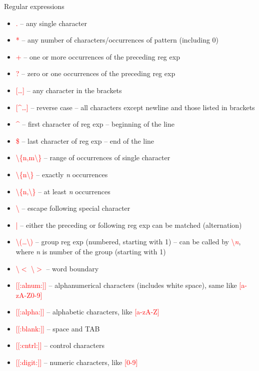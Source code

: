 \documentclass[compress, ucs, xelatex, 11pt, xcolor=svgnames,
  hyperref={
    bookmarks=true,
    unicode=true,
    colorlinks=true,
    pdftitle={Linux, command line and MetaCentrum},
    plainpages=false,
    pdfauthor={Vojtech Zeisek},
    pdfsubject={Course about use of Linux command line, writing shell scripts and using MetaCentrum of CESNET},
    pdfcreator={XeLaTeX},
    pdfkeywords={Linux, GNU, BASH, shell, command line, MetaCentrum},
    linkcolor=DarkRed,
    anchorcolor=DarkBlue,
    citecolor=Indigo,
    filecolor=NavyBlue,
    menucolor=DarkMagenta,
    urlcolor=DarkBlue,
    pdftex},
  url={hyphens, lowtilde} %
  ]{beamer}
\renewcommand{\alert}[1]{\textcolor{red}{#1}}
\begin{document}
\begin{frame}[allowframebreaks]{Regular expressions}
\label{regexp}
\begin{itemize}
  \item \alert{.} -- any single character
  \item \alert{*} -- any number of characters/occurrences of pattern (including 0)
  \item \alert{+} -- one or more occurrences of the preceding reg exp
  \item \alert{?} -- zero or one occurrences of the preceding reg exp
  \item \alert{[\ldots]} -- any character in the brackets
  \item \alert{[\textasciicircum\ldots]} -- reverse case -- all characters except newline and those listed in brackets
  \item \alert{\textasciicircum} -- first character of reg exp -- beginning of the line
  \item \alert{\$} -- last character of reg exp -- end of the line
  \item \alert{\textbackslash\{n,m\textbackslash\}} -- range of occurrences of single character
  \item \alert{\textbackslash\{n\textbackslash\}} -- exactly \textit{n} occurrences
  \item \alert{\textbackslash\{n,\textbackslash\}} -- at least \textit{n} occurrences
  \item \alert{\textbackslash} -- escape following special character
  \item \alert{|} -- either the preceding or following reg exp can be matched (alternation)
  \item \alert{\textbackslash(\ldots\textbackslash)} -- group reg exp (numbered, starting with 1) -- can be called by \alert{\textbackslash\textit{n}}, where \textit{n} is number of the group (starting with 1)
  \item \alert{\textbackslash$<$ \textbackslash$>$} -- word boundary
  \item \alert{[[:alnum:]]} -- alphanumerical characters (includes white space), same like \alert{[a-zA-Z0-9]}
  \item \alert{[[:alpha:]]} -- alphabetic characters, like \alert{[a-zA-Z]}
  \item \alert{[[:blank:]]} -- space and TAB
  \item \alert{[[:cntrl:]]} -- control characters
  \item \alert{[[:digit:]]} -- numeric characters, like \alert{[0-9]}

\end{itemize}
\end{frame}
\end{document}
